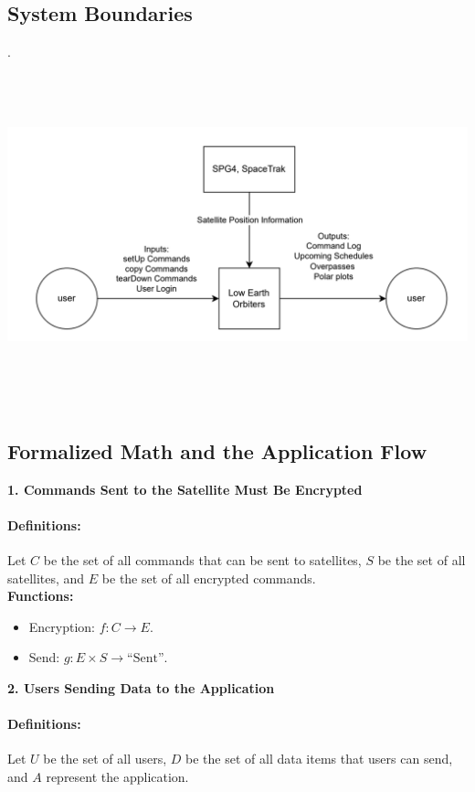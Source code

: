\documentclass[12pt]{article}
\begin{document}
\subsection{System Boundaries}
.\includegraphics[width=15cm, height=10cm]{systemcontext.png}

\subsection{Formalized Math and the Application Flow }
  
\textbf{1. Commands Sent to the Satellite Must Be Encrypted}

\paragraph{Definitions:}
Let $C$ be the set of all commands that can be sent to satellites, $S$ be the set of all satellites, and $E$ be the set of all encrypted commands.\\

\textbf{Functions:}
\begin{itemize}
  \item Encryption: $f : C \rightarrow E$.
  \item Send: $g : E \times S \rightarrow \text{``Sent''}$.
\end{itemize}

\textbf{2. Users Sending Data to the Application}

\paragraph{Definitions:}
Let $U$ be the set of all users, $D$ be the set of all data items that users can send, and $A$ represent the application.\\
\end{document}
